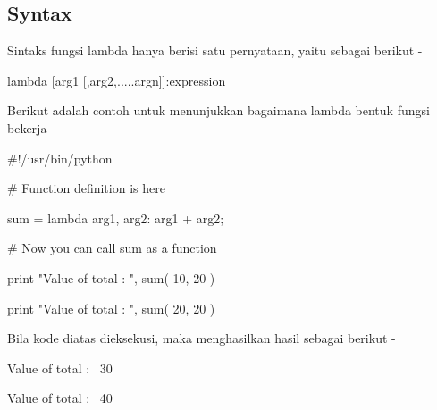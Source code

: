 \documentclass[a4paper,12pt]{report}
\begin{document}
\subsection*{Syntax}
 \par
\begin{adjustwidth}{0.03in}{0.03in}
Sintaks fungsi lambda hanya berisi satu pernyataan, yaitu sebagai berikut -\end{adjustwidth}
 \par
\noindent 
 \hspace*{0.5in} lambda [arg1 [,arg2,.....argn]]:expression \par
\begin{adjustwidth}{0.03in}{0.03in}
Berikut adalah contoh untuk menunjukkan bagaimana lambda bentuk fungsi bekerja -\end{adjustwidth}
 \par
\noindent 
 \hspace*{0.5in}  $  \#  $!/usr/bin/python \par
\vspace{12pt}
\noindent 
 \hspace*{0.5in}  $  \#  $ Function definition is here \par
\noindent 
 \hspace*{0.5in} sum = lambda arg1, arg2: arg1 + arg2; \par
\vspace{12pt}
\noindent 
  \par
\vspace{12pt}
\noindent 
 \hspace*{0.5in}  $  \#  $ Now you can call sum as a function \par
\noindent 
 \hspace*{0.5in} print "Value of total : ", sum( 10, 20 ) \par
\noindent 
 \hspace*{0.5in} print "Value of total : ", sum( 20, 20 ) \par
\begin{adjustwidth}{0.03in}{0.03in}
Bila kode diatas dieksekusi, maka menghasilkan hasil sebagai berikut -\end{adjustwidth}
 \par
\noindent 
 \hspace*{0.5in} Value of total :~ 30 \par
\noindent 
 \hspace*{0.5in} Value of total :~ 40 \par
\vspace{20pt}
\end{document}
